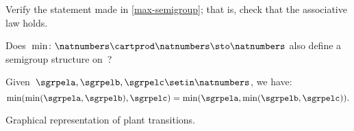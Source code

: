 \begin{exercise}
    \label{ex:max-semigroup}
    Verify the statement made in \cref{max-semigroup}; that is, check that the associative law holds.

    Does~$\min \colon \natnumbers \cartprod \natnumbers \sto \natnumbers$ also define a semigroup structure on~\natnumbers ?
\end{exercise}
\begin{solution}
    Given~$\sgrpela,\sgrpelb,\sgrpelc\setin \natnumbers$, we have:
    \begin{equation}
        \label{eq:min-assoc}
        \min(\min(\sgrpela,\sgrpelb),\sgrpelc)=\min(\sgrpela,\min(\sgrpelb,\sgrpelc)).
    \end{equation}
\end{solution}

\begin{marginfigure}
    \centering
    \caption{Graphical representation of plant transitions.}
    \label{fig:plants_transitions}
\end{marginfigure}


